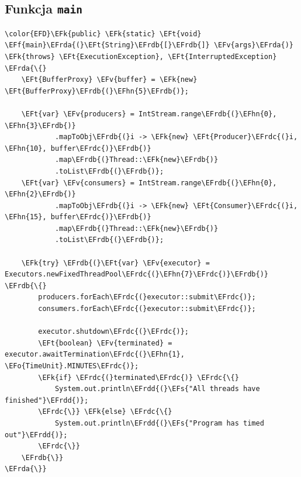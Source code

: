 \documentclass[11pt]{article}
\newcommand{\EFs}[1]{\textcolor{EFs}{#1}} %
\newcommand{\EFk}[1]{\textcolor{EFk}{#1}} %
\newcommand{\EFf}[1]{\textcolor{EFf}{#1}} %
\newcommand{\EFv}[1]{\textcolor{EFv}{#1}} %
\newcommand{\EFt}[1]{\textcolor{EFt}{#1}} %
\newcommand{\EFo}[1]{\textcolor{EFo}{#1}} %
\newcommand{\EFhn}[1]{\textcolor{EFhn}{#1}} %
\newcommand{\EFrda}[1]{\textcolor{EFrda}{#1}} %
\newcommand{\EFrdb}[1]{\textcolor{EFrdb}{#1}} %
\newcommand{\EFrdc}[1]{\textcolor{EFrdc}{#1}} %
\newcommand{\EFrdd}[1]{\textcolor{EFrdd}{#1}} %
\begin{document}
\subsection*{Funkcja \texttt{main}}
\label{sec:org711cb5f}
\begin{Code}
\begin{Verbatim}
\color{EFD}\EFk{public} \EFk{static} \EFt{void} \EFf{main}\EFrda{(}\EFt{String}\EFrdb{[}\EFrdb{]} \EFv{args}\EFrda{)} \EFk{throws} \EFt{ExecutionException}, \EFt{InterruptedException} \EFrda{\{}
    \EFt{BufferProxy} \EFv{buffer} = \EFk{new} \EFt{BufferProxy}\EFrdb{(}\EFhn{5}\EFrdb{)};

    \EFt{var} \EFv{producers} = IntStream.range\EFrdb{(}\EFhn{0}, \EFhn{3}\EFrdb{)}
            .mapToObj\EFrdb{(}i -> \EFk{new} \EFt{Producer}\EFrdc{(}i, \EFhn{10}, buffer\EFrdc{)}\EFrdb{)}
            .map\EFrdb{(}Thread::\EFk{new}\EFrdb{)}
            .toList\EFrdb{(}\EFrdb{)};
    \EFt{var} \EFv{consumers} = IntStream.range\EFrdb{(}\EFhn{0}, \EFhn{2}\EFrdb{)}
            .mapToObj\EFrdb{(}i -> \EFk{new} \EFt{Consumer}\EFrdc{(}i, \EFhn{15}, buffer\EFrdc{)}\EFrdb{)}
            .map\EFrdb{(}Thread::\EFk{new}\EFrdb{)}
            .toList\EFrdb{(}\EFrdb{)};

    \EFk{try} \EFrdb{(}\EFt{var} \EFv{executor} = Executors.newFixedThreadPool\EFrdc{(}\EFhn{7}\EFrdc{)}\EFrdb{)} \EFrdb{\{}
        producers.forEach\EFrdc{(}executor::submit\EFrdc{)};
        consumers.forEach\EFrdc{(}executor::submit\EFrdc{)};

        executor.shutdown\EFrdc{(}\EFrdc{)};
        \EFt{boolean} \EFv{terminated} = executor.awaitTermination\EFrdc{(}\EFhn{1}, \EFo{TimeUnit}.MINUTES\EFrdc{)};
        \EFk{if} \EFrdc{(}terminated\EFrdc{)} \EFrdc{\{}
            System.out.println\EFrdd{(}\EFs{"All threads have finished"}\EFrdd{)};
        \EFrdc{\}} \EFk{else} \EFrdc{\{}
            System.out.println\EFrdd{(}\EFs{"Program has timed out"}\EFrdd{)};
        \EFrdc{\}}
    \EFrdb{\}}
\EFrda{\}}
\end{Verbatim}
\end{Code}
\end{document}
